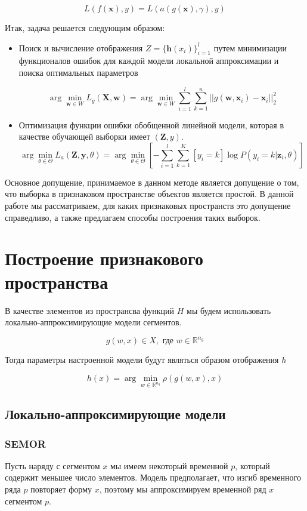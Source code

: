 \documentclass[12pt, fleqn, unicode]{article}
\newcommand{\bz}{\mathbf{z}}
\newcommand{\bx}{\mathbf{x}}
\newcommand{\by}{\mathbf{y}}
\newcommand{\bw}{\mathbf{w}}
\newcommand{\bX}{\mathbf{X}}
\newcommand{\bh}{\mathbf{h}}
\newcommand{\bZ}{\mathbf{Z}}
\newcommand{\R}{\mathbb{R}}
\newcommand{\sbrs}[1]{\left[#1\right]}
\begin{document}
$$
L(f(\bx), y) = L(a(g(\bx), \gamma), y)
$$

Итак, задача решается следующим образом:

\begin{itemize}
    \item Поиск и вычисление отображения $Z = \{\bh(x_i)\}_{i=1}^l$ путем
    минимизации функционалов ошибок для каждой модели локальной аппроксимации
    и поиска оптимальных параметров

    $$
    \arg\min_{\bw \in W} L_g(\bX, \bw) = \arg\min_{\bw \in W} \sum_{i=1}^l\sum_{k=1}^n ||g(\bw, \bx_i) - \bx_i||_2^2
    $$
    \item Оптимизация функции ошибки обобщенной линейной модели, которая в качестве
    обучающей выборки имеет $(\bZ, y)$.
    $$
    \arg\min_{\theta \in \Theta} L_a(\bZ, \by, \mathbb{\theta}) = \arg\min_{\mathbb{\theta} \in \Theta} \sbrs{-\sum_{i=1}^l\sum_{k=1}^K [y_i = k]\log P(y_i = k| \bz_i, \mathbb{\theta})}
    $$
\end{itemize}

Основное допущение, принимаемое в данном методе является допущение о том, что
выборка в признаковом пространстве объектов является простой. В данной работе
мы рассматриваем, для каких признаковых пространств это допущение справедливо,
а также предлагаем способы построения таких выборок.

\newpage
\section{Построение признакового пространства}

В качестве элементов из пространсва функций $H$ мы будем использовать
локально-аппроксимирующие модели сегментов.

$$
g(w, x) \in X, \text{ где }w \in \R^{n_g}
$$

Тогда параметры настроенной модели будут являться образом отображения $h$

$$
h(x) = \arg\min_{w \in \R^{n_g}} \rho(g(w, x), x)
$$

\subsection{Локально-аппроксимирующие модели}

\subsubsection{SEMOR}

Пусть наряду с сегментом $x$ мы имеем некоторый временной $p$, который содержит
меньшее число элементов. Модель предполагает, что изгиб временного ряда $p$ повторяет
форму $x$, поэтому мы аппроксимируем временной ряд $x$ сегментом $p$.
\end{document}
